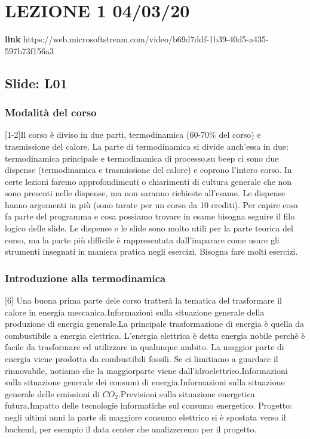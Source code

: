 \section{LEZIONE 1 04/03/20}
\textbf{link} https://web.microsoftstream.com/video/b69d7ddf-1b39-40d5-a435-597b73f156a3 
\subsection{Slide: L01}
\subsubsection{Modalità del corso}
[1-2]\newline
[3] Il corso è diviso in due parti, termodinamica (60-70\% del corso) e trasmissione del calore. La parte di termodinamica si divide anch'essa in due: termodinamica principale e termodinamica di processo.\newline
[4] su beep ci sono due dispense (termodinamica e trasmissione del calore) e coprono l'intero corso. In certe lezioni faremo approfondimenti o chiarimenti di cultura generale che non sono presenti nelle dispense, ma non saranno richieste all'esame. Le dispense hanno argomenti in più (sono tarate per un corso da 10 crediti). Per capire cosa fa parte del programma e cosa possiamo trovare in esame bisogna seguire il filo logico delle slide. Le dispense e le slide sono molto utili per la parte teorica del corso, ma la parte più difficile è rappresentata dall'imparare come usare gli strumenti insegnati in maniera pratica negli esercizi. Bisogna fare molti esercizi.\newline
[5] 
\subsubsection{Introduzione alla termodinamica}
[6] Una buona prima parte dele corso tratterà la tematica del trasformare il calore in energia meccanica.\newline
[7] Informazioni sulla situazione generale della produzione di energia generale.\newline
[8] La principale trasformazione di energia è quella da combustibile a energia elettrica. L'energia elettrica è detta energia nobile perchè è facile da trasformare ed utilizzare in qualunque ambito. La maggior parte di energia viene prodotta da combustibili fossili. Se ci limitiamo a guardare il rinnovabile, notiamo che la maggiorparte viene dall'idroelettrico.\newline
[9] Informazioni sulla situazione generale dei consumi di energia.\newline
[10-11] Informazioni sulla situazione generale delle emissioni di $CO_2$.\newline
[12] Previsioni sulla situazione energetica futura.\newline
[13] Impatto delle tecnologie informatiche sul consumo energetico. Progetto: negli ultimi anni la parte di maggiore consumo elettrico si è spostata verso il backend, per esempio il data center che analizzeremo per il progetto.

